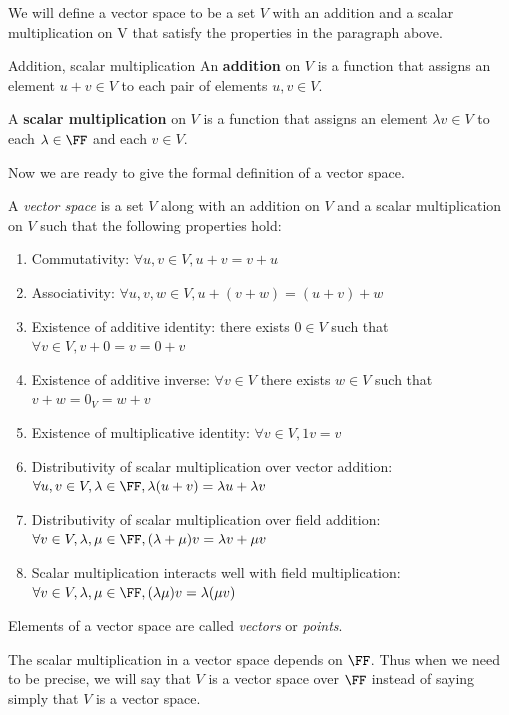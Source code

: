 We will define a vector space to be a set $V$ with an addition and a scalar multiplication on V that satisfy the properties in the paragraph above.

\begin{defn}{Addition, scalar multiplication}
An \textbf{addition} on $V$ is a function that assigns an element $u+v \in V$ to each pair of elements $u,v \in V$.

A \textbf{scalar multiplication} on $V$ is a function that assigns an element $\lambda v \in V$ to each $\lambda \in \FF$ and each $v \in V$.
\end{defn}

Now we are ready to give the formal definition of a vector space.

\begin{definition}
A \emph{vector space} is a set $V$ along with an addition on $V$ and a scalar multiplication on $V$ such that the following properties hold:
\begin{enumerate}[label=(\roman*)]
\item Commutativity: $\forall u, v \in V, u+v=v+u$
\item Associativity: $\forall u,v,w \in V, u+(v+w)=(u+v)+w$
\item Existence of additive identity: there exists $0 \in V$ such that $\forall v\in V, v + 0 = v = 0 + v$ 
\item Existence of additive inverse: $\forall v \in V$ there exists $w \in V$ such that $v + w = 0_V = w + v$ 
\item Existence of multiplicative identity: $\forall v\in V, 1v = v$
\item Distributivity of scalar multiplication over vector addition: $\forall u,v \in V, \lambda\in\FF, \lambda(u + v) = \lambda u + \lambda v$
\item Distributivity of scalar multiplication over field addition: $\forall v\in V, \lambda,\mu\in\FF, (\lambda+\mu)v = \lambda v + \mu v$
\item Scalar multiplication interacts well with field multiplication: $\forall v\in V, \lambda,\mu\in\FF, (\lambda\mu)v = \lambda(\mu v)$
\end{enumerate}
\end{definition}

Elements of a vector space are called \emph{vectors} or \emph{points}.

The scalar multiplication in a vector space depends on $\FF$. Thus when we need to be precise, we will say that $V$ is a vector space over $\FF$ instead of saying simply that $V$ is a vector space. 


